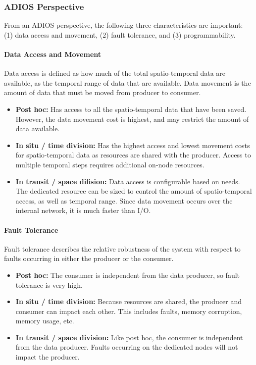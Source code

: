 \subsubsection{ADIOS Perspective}
From an ADIOS perspective, the following three characteristics are important: (1) data access and movement, (2) fault tolerance, and (3) programmability.

\paragraph{\textbf{Data Access and Movement}}
Data access is defined as how much of the total spatio-temporal data are available, as the temporal range of data that are available. Data movement is the amount of data that must be moved from producer to consumer.
\begin{itemize}
    \item \textbf{Post hoc:} Has access to all the spatio-temporal data that have been saved. However, the data movement cost is highest, and may restrict the amount of data available.
    \item \textbf{In situ / time division:} Has the highest access and lowest movement costs for spatio-temporal data as resources are shared with the producer. Access to multiple temporal steps requires additional on-node resources.
    \item \textbf{In transit / space difision:} Data access is configurable based on needs. The dedicated resource can be sized to control the amount of spatio-temporal access, as well as temporal range. Since data movement occurs over the internal network, it is much faster than I/O.
\end{itemize}

\paragraph{\textbf{Fault Tolerance}}
Fault tolerance describes the relative robustness of the system with respect to faults occurring in either the producer or the consumer.
\begin{itemize}
    \item \textbf{Post hoc:} The consumer is independent from the data producer, so fault tolerance is very high.
    \item \textbf{In situ / time division:} Because resources are shared, the producer and consumer can impact each other. This includes faults, memory corruption, memory usage, etc.
    \item \textbf{In transit / space division:} Like post hoc, the consumer is independent from the data producer. Faults occurring on the dedicated nodes will not impact the producer.
\end{itemize}


